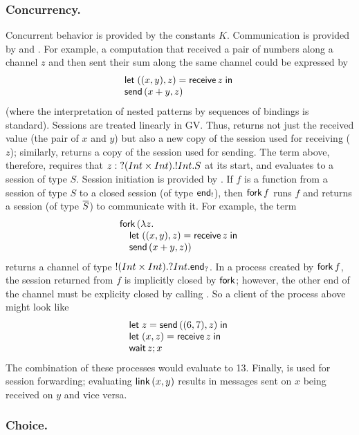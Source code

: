 \documentclass[orivec,envcountsame]{llncs}
\begin{document}
\subsubsection{Concurrency.}

Concurrent behavior is provided by the constants $K$.  Communication is provided by 
and .  For example, a computation that received a pair of numbers along a channel
$z$ and then sent their sum along the same channel could be expressed by
%
\[\bl
  \gvlet{((x, y), z)}{\gvreceive{z}}{} \\
  \gvsend{(x+y,z)}
\el\]
%
(where the interpretation of nested patterns by sequences of bindings is standard).  Sessions are
treated linearly in GV.  Thus,  returns not just the received value (the pair of
$x$ and $y$) but also a new copy of the session used for receiving ($z$); similarly, 
returns a copy of the session used for sending.  The term above, therefore, requires that $z :
{?(Int \times Int).{!Int.S}}$ at its start, and evaluates to a session of type $S$. Session
initiation is provided by .  If $f$ is a function from a session of type $S$ to a
closed session (of type $\mathsf{end}_!$), then $\mathsf{fork} \, f$ runs $f$ and returns a session (of
type $\overline{S}$) to communicate with it.  For example, the term
%
\[\bl
 \gvconst{fork} \app (\lambda z. \\
 \quad \bl
   \gvlet{((x, y), z)}{\gvreceive{z}}{} \\
   \gvsend{(x+y,z)}) \el
\el\]
%
returns a channel of type ${!(Int \times Int).{?Int.\mathsf{end}_?}}$.  In a process created by
$\mathsf{fork} \, f$, the session returned from $f$ is implicitly closed by $\mathsf{fork}$;
however, the other end of the channel must be explicity closed by calling .  So a
client of the process above might look like
%
\[\bl
  \gvlet{z}{\gvsend{((6,7),z)}}{} \\
  \gvlet{(x,z)}{\gvreceive{z}}{} \\
  \gvletunit{\gvconst{wait}\app z}{x}
\el\]
%
The combination of these processes would evaluate to 13.  Finally,  is used for
session forwarding; evaluating $\mathsf{link} \, (x, y)$ results in messages sent on $x$ being
received on $y$ and vice versa.

\subsubsection{Choice.}
\end{document}
